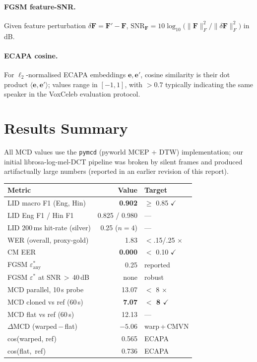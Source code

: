 \documentclass[conference]{IEEEtran}
\begin{document}
\paragraph*{FGSM feature-SNR.} Given feature perturbation
$\delta \mathbf{F} = \mathbf{F}' - \mathbf{F}$,
$\mathrm{SNR}_{\mathbf{F}} = 10\log_{10}\!\big(\lVert \mathbf{F}\rVert_F^2
/ \lVert \delta\mathbf{F}\rVert_F^2\big)$ in dB.

\paragraph*{ECAPA cosine.} For $\ell_2$-normalised ECAPA embeddings
$\mathbf{e}, \mathbf{e}'$, cosine similarity is their dot product
$\langle \mathbf{e}, \mathbf{e}'\rangle$; values range in $[-1, 1]$,
with $> 0.7$ typically indicating the same speaker in the VoxCeleb
evaluation protocol.

\section{Results Summary}

All MCD values use the \texttt{pymcd} (pyworld MCEP + DTW) implementation;
our initial librosa-log-mel-DCT pipeline was broken by silent frames and
produced artifactually large numbers (reported in an earlier revision of
this report).

\begin{center}
\scriptsize
\setlength{\tabcolsep}{3pt}
\begin{tabular}{@{}l r l@{}}
\toprule
\textbf{Metric} & \textbf{Value} & \textbf{Target} \\
\midrule
LID macro F1 (Eng, Hin)          & \textbf{0.902} & $\geq$ 0.85 $\checkmark$ \\
LID Eng F1 / Hin F1              & 0.825 / 0.980 & --- \\
LID 200\,ms hit-rate (silver)    & 0.25 ($n{=}4$)  & --- \\
WER (overall, proxy-gold)        & 1.83          & $<$.15/.25 $\times$ \\
CM EER                           & \textbf{0.000}& $<$ 0.10 $\checkmark$ \\
FGSM $\varepsilon^{*}_{\mathrm{any}}$          & 0.25 & reported \\
FGSM $\varepsilon^{*}$ at SNR\,$>$\,40\,dB     & none & robust \\
MCD parallel, 10\,s probe        & 13.07 & $<$ 8 $\times$ \\
MCD cloned vs ref (60\,s)        & \textbf{7.07} & \textbf{$<$ 8 $\checkmark$} \\
MCD flat vs ref (60\,s)          & 12.13 & --- \\
$\Delta$MCD (warped\,$-$\,flat)  & $\mathbf{-5.06}$ & warp\,+\,CMVN \\
cos(warped, ref)                 & 0.565 & ECAPA \\
cos(flat,\, ref)                 & 0.736 & ECAPA \\
\bottomrule
\end{tabular}
\end{center}
\end{document}

